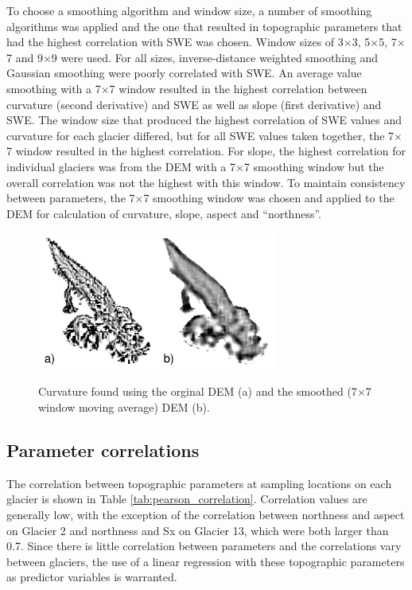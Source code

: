 \documentclass{sfuthesis}
\begin{document}
To choose a smoothing algorithm and window size, a number of smoothing algorithms was applied and the one that resulted in topographic parameters that had the highest correlation with SWE was chosen. Window sizes of 3$\times$3, 5$\times$5, 7$\times$7 and 9$\times$9 were used. For all sizes, inverse-distance weighted smoothing and Gaussian smoothing were poorly correlated with SWE. An average value smoothing with a 7$\times$7 window resulted in the highest correlation between curvature (second derivative) and SWE as well as slope (first derivative) and SWE. The window size that produced the highest correlation of SWE values and curvature for each glacier differed, but for all SWE values taken together, the 7$\times$7 window resulted in the highest correlation. For slope, the highest correlation for individual glaciers was from the DEM with a 7$\times$7 smoothing window but the overall correlation was not the highest with this window. To maintain consistency between parameters, the 7$\times$7 smoothing window was chosen and applied to the DEM for calculation of curvature, slope, aspect and ``northness''. 

\begin{figure}[h]
	\centering
	\includegraphics[width = 0.7\textwidth]{G13curvatureSmoothing.jpeg}\\
	\caption{Curvature found using the orginal DEM (a) and the smoothed (7$\times$7 window moving average) DEM (b).}
	\label{fig:smoothingCurve}
\end{figure}


\subsection{Parameter correlations}

The correlation between topographic parameters at sampling locations on each glacier is shown in Table \ref{tab:pearson_correlation}. Correlation values are generally low, with the exception of the correlation between northness and aspect on Glacier 2 and northness and Sx on Glacier 13, which were both larger than 0.7. Since there is little correlation between parameters and the correlations vary between glaciers, the use of a linear regression with these topographic parameters as predictor variables is warranted. 
\end{document}
